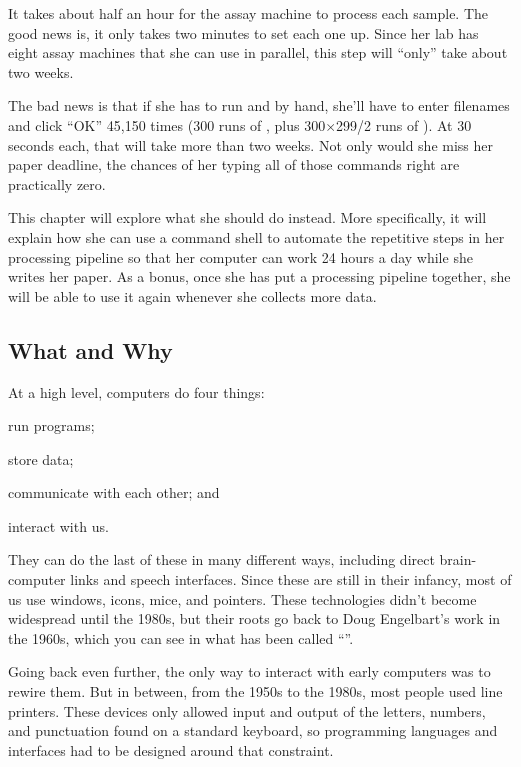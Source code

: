 It takes about half an hour for the assay machine to process each
sample. The good news is, it only takes two minutes to set each one up.
Since her lab has eight assay machines that she can use in parallel,
this step will ``only'' take about two weeks.

The bad news is that if she has to run  and
 by hand, she'll have to enter filenames and click
``OK'' 45,150 times (300 runs of , plus 300${\times}$299/2 runs
of ). At 30 seconds each, that will take more than two
weeks. Not only would she miss her paper deadline, the chances of her
typing all of those commands right are practically zero.

This chapter will explore what she should do instead. More
specifically, it will explain how she can use a command shell to
automate the repetitive steps in her processing pipeline so that her
computer can work 24 hours a day while she writes her paper. As a
bonus, once she has put a processing pipeline together, she will be
able to use it again whenever she collects more data.

\subsection*{What and Why}

At a high level, computers do four things:

\begin{swcitemize}
\item
  run programs;
\item
  store data;
\item
  communicate with each other; and
\item
  interact with us.
\end{swcitemize}

They can do the last of these in many different ways, including direct
brain-computer links and speech interfaces. Since these are still in
their infancy, most of us use windows, icons, mice, and pointers. These
technologies didn't become widespread until the 1980s, but their roots
go back to Doug Engelbart's work in the 1960s, which you can see in what
has been called ``''.

Going back even further, the only way to interact with early computers
was to rewire them. But in between, from the 1950s to the 1980s, most
people used line printers. These devices only allowed input and output
of the letters, numbers, and punctuation found on a standard keyboard,
so programming languages and interfaces had to be designed around that
constraint.

